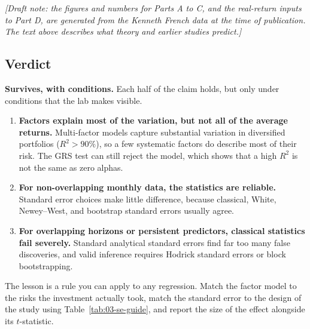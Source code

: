 \emph{[Draft note: the figures and numbers for Parts A to C, and the real-return inputs to Part D, are generated from the Kenneth French data at the time of publication. The text above describes what theory and earlier studies predict.]}

\subsection*{Verdict}
\textbf{Survives, with conditions.} Each half of the claim holds, but only under conditions that the lab makes visible.
\begin{enumerate}
  \item \textbf{Factors explain most of the variation, but not all of the average returns.} Multi-factor models capture substantial variation in diversified portfolios ($R^2 > 90\%$), so a few systematic factors do describe most of their risk. The GRS test can still reject the model, which shows that a high $R^2$ is not the same as zero alphas.
  \item \textbf{For non-overlapping monthly data, the statistics are reliable.} Standard error choices make little difference, because classical, White, Newey--West, and bootstrap standard errors usually agree.
  \item \textbf{For overlapping horizons or persistent predictors, classical statistics fail severely.} Standard analytical standard errors find far too many false discoveries, and valid inference requires Hodrick standard errors or block bootstrapping.
\end{enumerate}
The lesson is a rule you can apply to any regression. Match the factor model to the risks the investment actually took, match the standard error to the design of the study using Table~\ref{tab:03-se-guide}, and report the size of the effect alongside its $t$-statistic.
